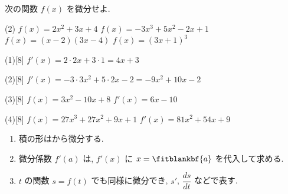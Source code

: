 \documentclass[14pt,dvipdfmx]{jsarticle}
\begin{document}
\quad
次の関数 $f(x)$ を微分せよ.
\par\vspace{-0.15em}
\begin{tasks}[label=(\arabic*), label-width=1.6zw, item-indent=2zw, after-item-skip=0.12em](2)
  \task $f(x)=2x^{2}+3x+4$
  \task $f(x)=-3x^{3}+5x^{2}-2x+1$
  \task $f(x)=(x-2)(3x-4)$
  \task $f(x)=(3x+1)^{3}$
\end{tasks}
\vspace{-0.2em}
\begin{answerbox}{(1)}[8]
  $f'(x)=2\cdot 2x+3\cdot 1=4x+3$
\end{answerbox}
\vspace{-0.35em}
\begin{answerbox}{(2)}[8]
  $f'(x)=-3\cdot 3x^{2}+5\cdot 2x-2=-9x^{2}+10x-2$
\end{answerbox}
\vspace{-0.35em}
\begin{answerbox}{(3)}[8]
  $f(x)=3x^{2}-10x+8$ \quad $f'(x)=6x-10$
\end{answerbox}
\vspace{-0.35em}
\begin{answerbox}{(4)}[8]
  $f(x)=27x^{3}+27x^{2}+9x+1$ \quad $f'(x)=81x^{2}+54x+9$
\end{answerbox}

\vfill
\begin{summarybox}
  \begin{enumerate}[label=\textbf{\arabic*}, leftmargin=1.5zw, itemsep=0.18em, topsep=0.1em]
    \item 積の形はから微分する.
    \item 微分係数 $f'(a)$ は, $f'(x)$ に
          $x=\fitblankbf{a}$ を代入して求める.
    \item $t$ の関数 $s=f(t)$ でも同様に微分でき,
          $s'$, $\dfrac{ds}{dt}$ などで表す.
  \end{enumerate}
\end{summarybox}

\vspace{0.15em}
\end{document}
